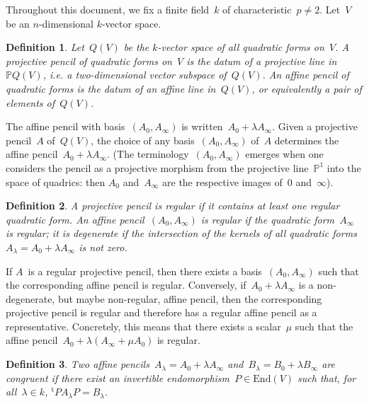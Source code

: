 \documentclass{article}
\newtheorem{df}{Definition}
\def\transpose#1{{}^{\mathrm{t}}\!#1}
\def\End{\mathrm{End}}
\begin{document}
Throughout this document, we fix a finite field~$k$ of characteristic~$p
\neq 2$. Let~$V$ be an $n$-dimensional $k$-vector space.

\begin{df}
Let~$Q(V)$ be the $k$-vector space of all quadratic forms on~$V$.
A \emph{projective pencil of quadratic forms} on~$V$ is the datum of a
projective line in~$\mathbb{P}Q(V)$, \emph{i.e.} a two-dimensional vector subspace
of~$Q(V)$. An \emph{affine pencil of quadratic forms} is
the datum of an affine line in~$Q(V)$, or equivalently a pair of elements
of~$Q(V)$.
\end{df}

The affine pencil with basis~$(A_{0}, A_{\infty})$ is written~$A_{0} + \lambda
A_{\infty}$. Given a projective pencil~$A$ of~$Q(V)$, the choice of any
basis~$(A_0, A_{\infty})$ of~$A$ determines the affine pencil~$A_{0} + \lambda
A_{\infty}$. (The terminology~$(A_{0}, A_{\infty})$ emerges when one considers the
pencil as a projective morphism from the projective line~$\mathbb{P}^1$ into the
space of quadrics: then $A_{0}$ and~$A_{\infty}$ are the respective images
of~$0$ and~$\infty$).

\begin{df}
A projective pencil is \emph{regular} if it contains at least one regular
quadratic form. An affine pencil~$(A_{0}, A_{\infty})$ is \emph{regular} if
the quadratic form~$A_{\infty}$ is regular; it is \emph{degenerate} if the
intersection of the kernels of all quadratic forms~$A_{\lambda} = A_0 + \lambda
A_{\infty}$ is not zero.
\end{df}

If $A$~is a regular projective pencil, then there exists a basis~$(A_{0},
A_{\infty})$ such that the corresponding affine pencil is regular. Conversely,
if~$A_{0} + \lambda A_{\infty}$ is a non-degenerate, but maybe non-regular, affine
pencil, then the corresponding projective pencil is regular and therefore
has a regular affine pencil as a representative. Concretely, this means
that there exists a scalar~$\mu$ such that the affine pencil~$A_0 + \lambda
(A_{\infty} + \mu A_0)$ is regular.

\begin{df}
Two affine pencils~$A_\lambda = A_0 + \lambda A_{\infty}$ and~$B_\lambda = B_0 + \lambda B_{\infty}$ are
\emph{congruent} if there exist an invertible endomorphism~$P \in
\End(V)$ such that, for all~$\lambda \in k$, $\transpose{P} A_{\lambda} P = B_{\lambda}$.
\end{df}
\end{document}
